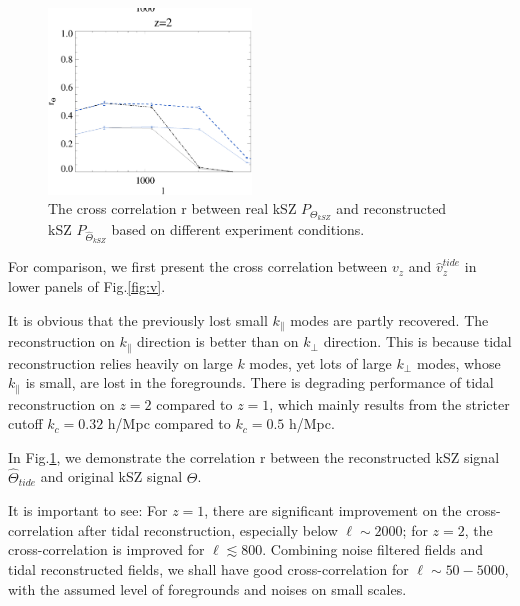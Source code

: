 \begin{figure}[tbp]
\begin{center}
\includegraphics[width=0.48\textwidth]{figure/cl_correlation_z1_z2.eps}
\end{center}
\vspace{-0.7cm}
\caption{The cross correlation r between real kSZ $P_{\Theta_{kSZ}}$ 
and reconstructed kSZ $P_{\hat \Theta_{kSZ}}$ 
based on different experiment conditions.
}
\label{fig:r}
\end{figure}
\label{ssec:tide}
For comparison, we first present the cross correlation between $v_z$ and $\hat v_z^{tide}$ in lower panels of Fig.\ref{fig:v}. 

It is obvious that the previously lost small $k_\parallel$ modes are partly recovered. 
The reconstruction on $k_\parallel$ direction is better than on $k_\perp$ direction.
This is because tidal reconstruction relies heavily on large $k$ modes, 
yet lots of large $k_\perp$ modes, whose $k_\parallel$ is small, are lost in the foregrounds. 
There is degrading performance of tidal reconstruction on $z=2$ compared to $z=1$, 
which mainly results from the stricter cutoff $k_c=0.32$ h/Mpc compared to $k_c=0.5$ h/Mpc.

In Fig.\ref{fig:r}, 
we demonstrate the correlation r between the reconstructed kSZ signal $\hat \Theta_{tide}$ and original kSZ signal $\Theta$. 

It is important to see:
For $z=1$, there are significant improvement on the cross-correlation after tidal reconstruction, especially below $\ell \sim 2000$; 
for $z=2$, the cross-correlation is improved for $\ell \lesssim 800$. 
Combining noise filtered fields and tidal reconstructed fields, we shall have good cross-correlation for $\ell  \sim 50-5000$, 
with the assumed level of foregrounds and noises on small scales.


